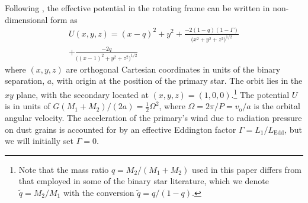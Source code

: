 \documentclass[useAMS, usenatbib, a4paper]{mnras}
\newcommand\orb{\ensuremath{_{\mathrm{o}}}}
\newcommand\qq{\ensuremath{\tilde{q}}}
\begin{document}
Following \citet{Seidov:2004a},
the effective potential in the rotating frame
can be written in non-dimensional form as
\begin{multline}
  \label{eq:effective-potential}
  U(x, y, z) = (x - q)^2 + y^2               %
  + \frac{-2 (1 - q) (1 - \Gamma)}{\bigl(x^2 + y^2 + z^2\bigr)^{1/2}} \\ %
  + \frac{-2 q}{\bigl((x-1)^2 + y^2 + z^2\bigr)^{1/2}}   %
\end{multline}
where \((x, y, z)\) are orthogonal Cartesian coordinates
in units of the binary separation, \(a\),
with origin at the position of the primary star. The orbit lies in the \(xy\) plane,
with the secondary located at \((x, y, z) = (1, 0, 0)\).\footnote{%
  Note that the mass ratio \(q = M_2 / (M_1 + M_2)\) used in this paper differs from that
  employed in some of the binary star literature, which we denote \(\qq = M_2 / M_1\)
  with the conversion \(\qq = q / (1 - q)\).
}
The potential \(U\) is in units of \(G (M_1 + M_2) / (2 a) = \frac12 \Omega^2\), where \(\Omega = 2 \pi / P = v\orb / a\) is the orbital angular velocity.
The acceleration of the primary's wind due to radiation pressure on dust grains is
accounted for by an effective Eddington factor \(\Gamma = L_1 / L_{\mathrm{Edd}}\), but we will initially set \(\Gamma = 0\). 






\bsp	%
\label{lastpage}
\end{document}
